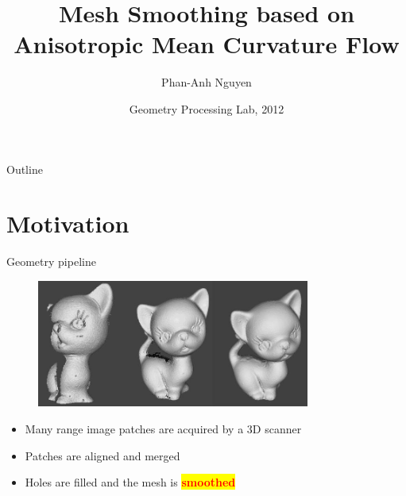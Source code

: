 \documentclass{beamer}
\title[Anisotropic Mean Curvature] %
{Mesh Smoothing based on Anisotropic Mean Curvature Flow}
\author[Phan-Anh] %
{
Phan-Anh Nguyen\inst{1} 
}
\institute[Chair of Computer Graphics \& Multimedia] %
{
  \inst{1}%
  Chair of Computer Graphics \& Multimedia\\
  RWTH-Aachen University
}
\date[GP Lab 2012] %
{Geometry Processing Lab, 2012}
\begin{document}
\begin{frame}
  \titlepage
\end{frame}

\begin{frame}{Outline}
  \tableofcontents
\end{frame}





\section{Motivation}

\begin{frame}{Geometry pipeline}
\begin{figure}[htb]
\centering
\includegraphics[width=0.8\textwidth]{kitten_pipeline.jpg}
\label{fig:pipeline}
\end{figure}
\begin{itemize}
\item Many range image patches are acquired by a 3D scanner
\item Patches are aligned and merged
\item Holes are filled and the mesh is 
\colorbox{yellow}{ 
    \textcolor{red}{ 
        \textbf{ 
            smoothed
        } 
    } 
} 
\end{itemize}
\end{frame}
\end{document}
